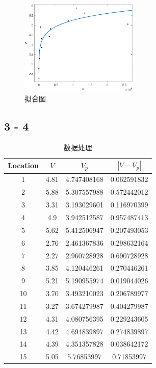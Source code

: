 \documentclass{article}
\begin{document}
\begin{figure}[!h]
    \centering
    \includegraphics[width=0.5\textwidth]{pic/hw5_3.png}
    \caption{拟合图}
\end{figure}


\subsection{3 - 4}

\begin{table}[!h]
\begin{center}
\begin{tabular}{|c|c|c|c|}
    \hline
    Location & $V$ & $V_p$ & $|V-V_p|$ \\
    \hline
    1 &	4.81	& 4.747408168 & 0.062591832\\
\hline
2 &	5.88 &	5.307557988 &	0.572442012\\
\hline
3 &	3.31 &	3.193029601 &	0.116970399\\
\hline
4 &	4.9	 & 3.942512587 &	0.957487413\\
\hline
5 &	5.62 &	5.412506947 &	0.207493053\\
\hline
6 &	2.76 &	2.461367836 &	0.298632164\\
\hline
7	& 2.27	 & 2.960728928 &	0.690728928\\
\hline
8 &	3.85 &	4.120446261 &	0.270446261\\
\hline
9 &	5.21 &	5.190955974 &	0.019044026\\
\hline
10 &	3.70 & 	3.493210023 &	0.206789977\\
\hline
11	 & 3.27 &	3.674279987  &	0.404279987\\
\hline
12 &	4.31 &	4.080756395 &	0.229243605\\
\hline
13 &	4.42 &	4.694839897 &	0.274839897\\
\hline 
14 &	4.39 &	4.351357828 &	0.038642172\\
\hline
15 &	5.05 &	5.76853997 &	0.71853997\\
\hline
\end{tabular}
\caption{\label{demo-table}数据处理}
\end{center}
\end{table}
\end{document}
